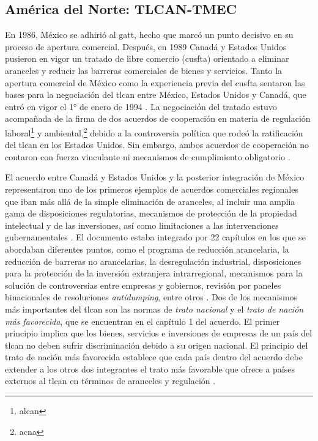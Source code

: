 \clearpage
\subsection{América del Norte: TLCAN-TMEC}


En 1986, México se adhirió al \acrfull{gatt}, hecho que marcó un punto decisivo en su proceso de apertura comercial. Después, en 1989 Canadá y Estados Unidos pusieron en vigor un tratado de libre comercio (\acrshort{cusfta}) orientado a eliminar aranceles y reducir las barreras comerciales de bienes y servicios. Tanto la apertura comercial de México como la experiencia previa del \acrshort{cusfta} sentaron las bases para la negociación del \acrfull{tlcan} entre México, Estados Unidos y Canadá, que entró en vigor el 1° de enero de 1994 \parencite[p.~170]{Nagy2025}. La negociación del tratado estuvo acompañada de la firma de dos acuerdos de cooperación en materia de regulación laboral\footnote{\gls{alcan}} y ambiental,\footnote{\gls{acna}} debido a la controversia política que rodeó la ratificación del \gls{tlcan} en los Estados Unidos. Sin embargo, ambos acuerdos de cooperación no contaron con fuerza vinculante ni mecanismos de cumplimiento obligatorio \parencite[pp.~277, 283]{Stanford2019}. 

El acuerdo entre Canadá y Estados Unidos y la posterior integración de México representaron uno de los primeros ejemplos de acuerdos comerciales regionales que iban más allá de la simple eliminación de aranceles, al incluir una amplia gama de disposiciones regulatorias, mecanismos de protección de la propiedad intelectual y de las inversiones, así como limitaciones a las intervenciones gubernamentales \parencite[pp.~279--281]{Stanford2019}. El documento estaba integrado por 22 capítulos en los que se abordaban diferentes puntos, como el programa de reducción arancelaria, la reducción de barreras no arancelarias, la desregulación industrial, disposiciones para la protección de la inversión extranjera intrarregional, mecanismos para la solución de controversias entre empresas y gobiernos, revisión por paneles binacionales de resoluciones \textit{antidumping}, entre otros \parencite[véase][]{Stanford2019}. Dos de los mecanismos más importantes del \gls{tlcan} son las normas de \textit{trato nacional} y el \textit{trato de nación más favorecida}, que se encuentran en el capítulo 1 del acuerdo. El primer principio implica que los bienes, servicios e inversiones de empresas de un país del \gls{tlcan} no deben sufrir discriminación debido a su origen nacional. El principio del trato de nación más favorecida establece que cada país dentro del acuerdo debe extender a los otros dos integrantes el trato más favorable que ofrece a países externos al \gls{tlcan} en términos de aranceles y regulación \parencite[p.~21]{Anderson2008}.

